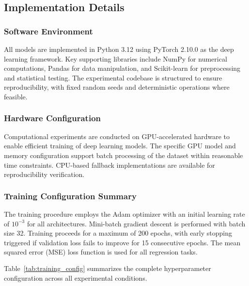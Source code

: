 \documentclass[5p,times]{elsarticle}
\begin{document}
\subsection{Implementation Details}\label{sec:implementation}

\subsubsection{Software Environment}

All models are implemented in Python 3.12 using PyTorch 2.10.0 as the deep learning framework. Key supporting libraries include NumPy for numerical computations, Pandas for data manipulation, and Scikit-learn for preprocessing and statistical testing. The experimental codebase is structured to ensure reproducibility, with fixed random seeds and deterministic operations where feasible.

\subsubsection{Hardware Configuration}

Computational experiments are conducted on GPU-accelerated hardware to enable efficient training of deep learning models. The specific GPU model and memory configuration support batch processing of the dataset within reasonable time constraints. CPU-based fallback implementations are available for reproducibility verification.

\subsubsection{Training Configuration Summary}

The training procedure employs the Adam optimizer with an initial learning rate of $10^{-3}$ for all architectures. Mini-batch gradient descent is performed with batch size 32. Training proceeds for a maximum of 200 epochs, with early stopping triggered if validation loss fails to improve for 15 consecutive epochs. The mean squared error (MSE) loss function is used for all regression tasks.

Table~\ref{tab:training_config} summarizes the complete hyperparameter configuration across all experimental conditions.
\end{document}
